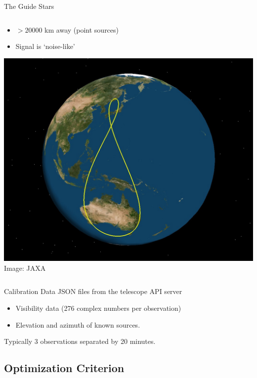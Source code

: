 \documentclass[ignorenonframetext]{beamer}
\begin{document}
\begin{frame}{The Guide Stars}
\begin{columns}
\begin{column}{0.5\linewidth}
\begin{itemize}
   \item $>20000$ km away (point sources)
   \item Signal is `noise-like'
  \end{itemize}
   \includegraphics[width=\textwidth]{fig/qzss_ground_track.jpg}
   {\tiny Image: JAXA}
  \end{column}
 \end{columns}
\end{frame}

\begin{frame}{Calibration Data}
JSON files from the telescope API server
\begin{itemize}
 \item Visibility data (276 complex numbers per observation)
 \item Elevation and azimuth of known sources.
\end{itemize}
Typically 3 observations separated by 20 minutes.
\end{frame}


\subsection{Optimization Criterion}
\end{document}
